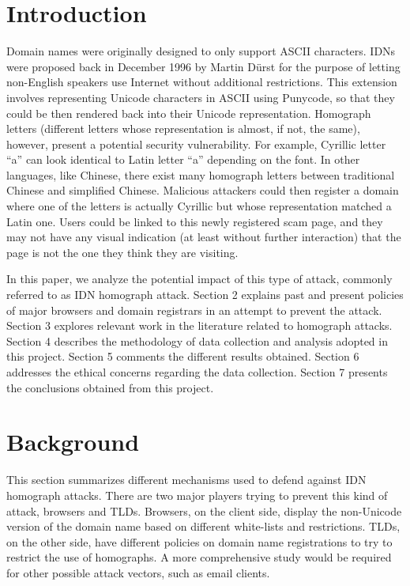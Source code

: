 \documentclass[letterpaper,twocolumn,10pt]{article}
\begin{document}
\section{Introduction}
Domain names were originally designed to only support ASCII characters.
IDNs were proposed back in December 1996 by Martin D\"{u}rst for the purpose of letting non-English speakers use Internet without additional restrictions.
This extension involves representing Unicode characters in ASCII using Punycode, so that they could be then rendered back into their Unicode representation.
Homograph letters (different letters whose representation is almost, if not, the same), however, present a potential security vulnerability.
For example, Cyrillic letter ``a'' can look identical to Latin letter ``a'' depending on the font.
In other languages, like Chinese, there exist many homograph letters between traditional Chinese and simplified Chinese.
Malicious attackers could then register a domain where one of the letters is actually Cyrillic but whose representation matched a Latin one.
Users could be linked to this newly registered scam page, and they may not have any visual indication (at least without further interaction) that the page is not the one they think they are visiting.

In this paper, we analyze the potential impact of this type of attack, commonly referred to as IDN homograph attack.
Section 2 explains past and present policies of major browsers and domain registrars in an attempt to prevent the attack.
Section 3 explores relevant work in the literature related to homograph attacks.
Section 4 describes the methodology of data collection and analysis adopted in this project.
Section 5 comments the different results obtained.
Section 6 addresses the ethical concerns regarding the data collection.
Section 7 presents the conclusions obtained from this project.

\section{Background}
This section summarizes different mechanisms used to defend against IDN homograph attacks.
There are two major players trying to prevent this kind of attack, browsers and TLDs.
Browsers, on the client side, display the non-Unicode version of the domain name based on different white-lists and restrictions.
TLDs, on the other side, have different policies on domain name registrations to try to restrict the use of homographs.
A more comprehensive study would be required for other possible attack vectors, such as email clients.
\end{document}
